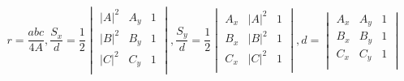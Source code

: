 \documentclass[12pt]{article}
\begin{document}
\[
    r = \frac{abc}{4A}, \frac{S_x}{d} = \frac{1}{2} \begin{vmatrix}
        |A|^2 & A_y & 1 \\
        |B|^2 & B_y & 1 \\
        |C|^2 & C_y & 1 \\
    \end{vmatrix}, \frac{S_y}{d} = \frac{1}{2} \begin{vmatrix}
        A_x & |A|^2 & 1 \\
        B_x & |B|^2 & 1 \\
        C_x & |C|^2 & 1 \\
    \end{vmatrix}, d = \begin{vmatrix}
        A_x & A_y & 1 \\
        B_x & B_y & 1 \\
        C_x & C_y & 1 \\
    \end{vmatrix} 
\
\]
\end{document}
